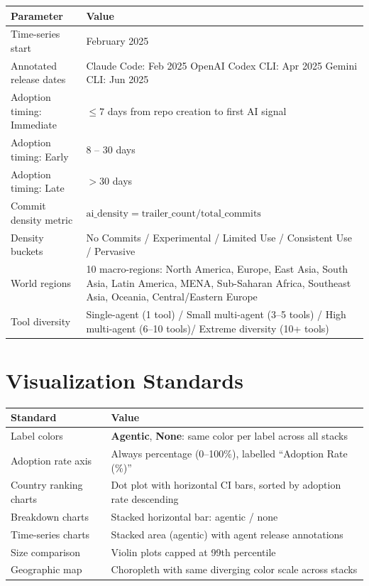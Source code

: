 \documentclass[9.5pt,a4paper]{article}
\begin{document}
\begin{tabular}{@{}p{4.8cm} p{11.4cm}@{}}
\toprule
\textbf{Parameter} & \textbf{Value} \\
\midrule
\rowcolor{rowgray}
Time-series start & February 2025 \\
Annotated release dates & Claude Code: Feb 2025 \quad OpenAI Codex CLI: Apr 2025 \quad Gemini CLI: Jun 2025 \\

Adoption timing: Immediate & $\leq 7$ days from repo creation to first AI signal \\
\rowcolor{rowgray}
Adoption timing: Early & 8 -- 30 days \\
Adoption timing: Late & $> 30$ days \\
\rowcolor{rowgray}
Commit density metric & $\text{ai\_density} = \text{trailer\_count} / \text{total\_commits}$ \\
Density buckets & No Commits / Experimental / Limited Use / Consistent Use / Pervasive \\
\rowcolor{rowgray}
World regions & 10 macro-regions: North America, Europe, East Asia, South Asia, Latin America, MENA, Sub-Saharan Africa, Southeast Asia, Oceania, Central/Eastern Europe \\
\rowcolor{rowgray}
Tool diversity & Single-agent (1 tool) / Small multi-agent (3–5 tools) / High multi-agent (6–10 tools)/ Extreme diversity (10+ tools) \\

\bottomrule
\end{tabular}

\section{Visualization Standards}

\begin{tabular}{@{}p{4.8cm} p{11.4cm}@{}}
\toprule
\textbf{Standard} & \textbf{Value} \\
\midrule
\rowcolor{rowgray}
Label colors & \textbf{Agentic}, \textbf{None}: same color per label across all stacks \\
Adoption rate axis & Always percentage (0--100\%), labelled ``Adoption Rate (\%)'' \\
Country ranking charts & Dot plot with horizontal CI bars, sorted by adoption rate descending \\
\rowcolor{rowgray}
Breakdown charts & Stacked horizontal bar: agentic / none \\
Time-series charts & Stacked area (agentic) with agent release annotations \\
\rowcolor{rowgray}
Size comparison & Violin plots capped at 99th percentile \\
Geographic map & Choropleth with same diverging color scale across stacks \\
\bottomrule
\end{tabular}
\end{document}
